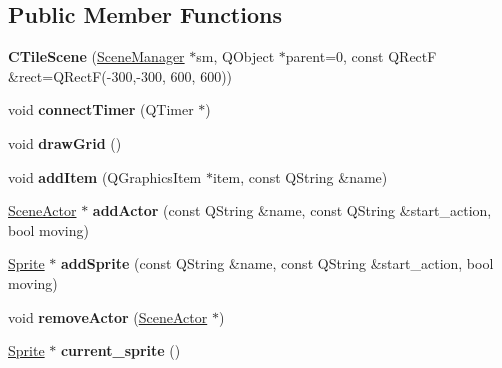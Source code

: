 \subsection*{Public Member Functions}
\begin{DoxyCompactItemize}
\item 
\mbox{\label{class_c_tile_scene_a27f6fe343e7ca099fa3a5b90b9bd227f}} 
{\bfseries C\+Tile\+Scene} (\hyperlink{class_scene_manager}{Scene\+Manager} $\ast$sm, Q\+Object $\ast$parent=0, const Q\+RectF \&rect=Q\+RectF(-\/300,-\/300, 600, 600))
\item 
\mbox{\label{class_c_tile_scene_ae1d5a49f90032db74ac86d1dca1f07b2}} 
void {\bfseries connect\+Timer} (Q\+Timer $\ast$)
\item 
\mbox{\label{class_c_tile_scene_afb80cf098ed78c1c8d9c0e1500e145bd}} 
void {\bfseries draw\+Grid} ()
\item 
\mbox{\label{class_c_tile_scene_aaad125b8512818114c41b96781636aff}} 
void {\bfseries add\+Item} (Q\+Graphics\+Item $\ast$item, const Q\+String \&name)
\item 
\mbox{\label{class_c_tile_scene_abfed42d6cd9d830be950424c20edda89}} 
\hyperlink{class_actor}{Scene\+Actor} $\ast$ {\bfseries add\+Actor} (const Q\+String \&name, const Q\+String \&start\+\_\+action, bool moving)
\item 
\mbox{\label{class_c_tile_scene_a57a63442391636814109c89a77f61d59}} 
\hyperlink{class_sprite}{Sprite} $\ast$ {\bfseries add\+Sprite} (const Q\+String \&name, const Q\+String \&start\+\_\+action, bool moving)
\item 
\mbox{\label{class_c_tile_scene_a6a969e412f6e8545147af0ba497af4a1}} 
void {\bfseries remove\+Actor} (\hyperlink{class_actor}{Scene\+Actor} $\ast$)
\item 
\mbox{\label{class_c_tile_scene_ac13ea7011de0c3e9bd265d0394f39db5}} 
\hyperlink{class_sprite}{Sprite} $\ast$ {\bfseries current\+\_\+sprite} ()
\item 
\mbox{\label{class_c_tile_scene_aa7a986b98b756412e5a2d005c4f1ff14}} 

\end{DoxyCompactItemize}
